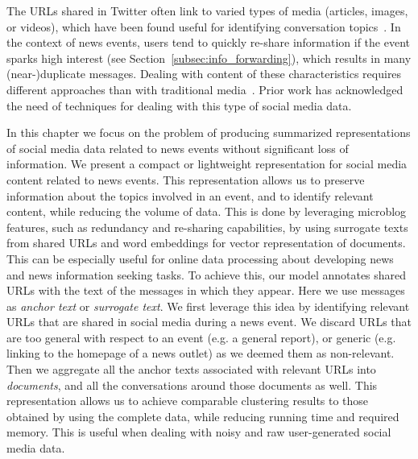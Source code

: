%
%
The URLs shared in Twitter often link to varied types of media (articles,
images, or videos), which have been found useful for identifying conversation
topics~\cite{mishne2012twanchor}.
%
In the context of news events, users tend to quickly re-share information if the
event sparks high interest (see Section~\ref{subsec:info_forwarding}), which
results in many (near-)duplicate messages.
%
Dealing with content of these characteristics requires different approaches
than with traditional media~\cite{Alonso:2017:WHH:3091478.3091484}.
%
Prior work has acknowledged the need of techniques for dealing with this type of
social media data.


In this chapter we focus on the problem of producing summarized representations of
social media data related to news events without significant loss of
information.
%
We present a compact or lightweight representation for social media content related to news
events.
%
This representation allows us to preserve information about the topics involved
in an event, and to identify relevant content, while reducing the volume of
data.
%
This is done by leveraging microblog features, such as redundancy
and re-sharing capabilities, by using surrogate texts from shared URLs and 
word embeddings for vector representation of documents.
%
This can be especially useful for online data processing about developing news
and news information seeking tasks.
%
To achieve this, our model annotates shared URLs with the text of the messages
in which they appear.
%
Here we use messages as {\em anchor text} or {\em surrogate text}. 
%
We first leverage this idea by identifying relevant URLs that are shared in
social media during a news event.
%
We discard URLs that are too general with respect to an event (e.g. a general
report), or generic (e.g. linking to the homepage of a news outlet) as we deemed
them as non-relevant.
%
Then we aggregate all the anchor texts associated with relevant URLs into {\em
documents}, and all the conversations around those documents as well. 
%
This representation allows us to achieve comparable clustering results to 
those obtained by using the complete data, while reducing running time and 
required memory.
%
This is useful when dealing with noisy and raw user-generated social media data.




